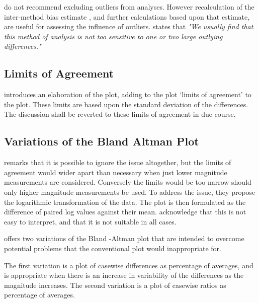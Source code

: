 \documentclass{report}
\begin{document}
\citet*{BA99} do not recommend excluding outliers from analyses.
However recalculation of the inter-method bias estimate , and
further calculations based upon that estimate, are useful for
assessing the influence of outliers.\citep{BA99} states that
\emph{"We usually find that this method of analysis is not too
	sensitive to one or two large outlying differences."}

\subsection{Limits of Agreement}
\citet{BA86} introduces an elaboration of the plot, adding to the
plot `limits of agreement' to the plot. These limits are based
upon the standard deviation of the differences. The discussion
shall be reverted to these limits of agreement in due course.

\subsection{Variations of the Bland Altman Plot}
\citet{BA99} remarks that it is possible to ignore the issue
altogether, but the limits of agreement would wider apart than
necessary when just lower magnitude measurements are considered.
Conversely the limits would be too narrow should only higher
magnitude measurements be used. To address the issue, they propose
the logarithmic transformation of the data. The plot is then
formulated as the difference of paired log values against their
mean. \citet{BA99} acknowledge that this is not easy to interpret,
and that it is not suitable in all cases.

\citet{BA99} offers two variations of the Bland -Altman plot that
are intended to overcome potential problems that the conventional
plot would inappropriate for.

The first variation is a plot of casewise differences as
percentage of averages, and is appropriate when there is an
increase in variability of the differences as the magnitude
increases. The second variation is a plot of casewise ratios as
percentage of averages.






\end{document}
